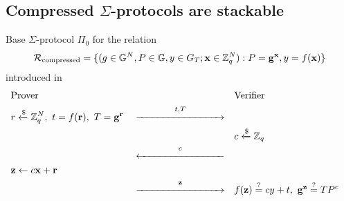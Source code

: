 \subsection{Compressed $\Sigma$-protocols are stackable}
\begin{protocol}[]{Base $\Sigma$-protocol $\Pi_0$ for the relation 
$$\mathcal R_{\text{compressed}} = \{(g \in \mathbb{G}^N, P \in \mathbb{G}, y \in G_T; \mathbf{x} \in \mathbb{Z}_q^N): P = \mathbf{g^x}, y = f(\mathbf{x})\}$$ introduced in \cite{attema}} 
   \vspace{-0.5cm}
   \begin{align*}
       &\text{Prover}& 
       &&
       &\text{Verifier}& 
       \\
       &r \samplefrom \Z_q^N,\ t = f(\mathbf{r}),\ T = \mathbf{g^r}&
       &\overset  {t, T} {\xrightarrow{\hspace{3cm}}}&
       && 
       \\
       &&
       &&
       &c \samplefrom \Z_q&
       \\
       &&
       &\overset c {\xleftarrow{\hspace{3cm}}}&
       &&
       \\
       &\mathbf{z} \leftarrow c\mathbf{x} + \mathbf{r}&
       &&
       &&
       \\
       &&
       &\overset {\mathbf{z}} {\xrightarrow{\hspace{3cm}}}&
       &f(\mathbf{z}) \verify cy + t, \ \mathbf{g^z} \verify TP^c&
   \end{align*}
   \label{prot:base-compressed}
\end{protocol}